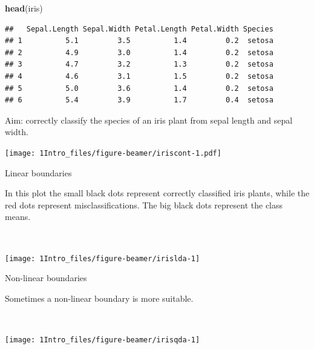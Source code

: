 \documentclass[
  10pt,
  ignorenonframetext,
]{beamer}
\newenvironment{Shaded}{\begin{snugshade}}{\end{snugshade}}
\newcommand{\FunctionTok}[1]{\textcolor[rgb]{0.13,0.29,0.53}{\textbf{#1}}}
\newcommand{\NormalTok}[1]{#1}
\begin{document}
\begin{frame}[fragile]
\scriptsize

\begin{Shaded}
\begin{Highlighting}[]
\FunctionTok{head}\NormalTok{(iris)}
\end{Highlighting}
\end{Shaded}

\begin{verbatim}
##   Sepal.Length Sepal.Width Petal.Length Petal.Width Species
## 1          5.1         3.5          1.4         0.2  setosa
## 2          4.9         3.0          1.4         0.2  setosa
## 3          4.7         3.2          1.3         0.2  setosa
## 4          4.6         3.1          1.5         0.2  setosa
## 5          5.0         3.6          1.4         0.2  setosa
## 6          5.4         3.9          1.7         0.4  setosa
\end{verbatim}

\normalsize
\end{frame}

\begin{frame}
Aim: correctly classify the species of an iris plant from sepal length
and sepal width.

\texttt{[image: 1Intro\_files/figure-beamer/iriscont-1.pdf]}
\end{frame}

\begin{frame}
\begin{block}{Linear boundaries}
\protect\hypertarget{linear-boundaries}{}
\vspace{2mm}

In this plot the small black dots represent correctly classified iris
plants, while the red dots represent misclassifications. The big black
dots represent the class means.

~

\texttt{[image: 1Intro\_files/figure-beamer/irislda-1]}
\end{block}
\end{frame}

\begin{frame}
\begin{block}{Non-linear boundaries}
\protect\hypertarget{non-linear-boundaries}{}
\vspace{2mm}

Sometimes a non-linear boundary is more suitable.

\(~\)

\texttt{[image: 1Intro\_files/figure-beamer/irisqda-1]}
\end{block}
\end{frame}
\end{document}
